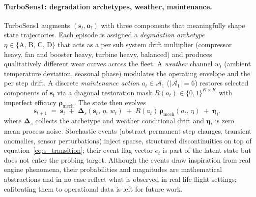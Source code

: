 \documentclass{article}
\begin{document}
\paragraph{TurboSens1: degradation archetypes, weather, maintenance.}
TurboSens1 augments $(\mathbf{s}_t, \mathbf{o}_t)$ with three components that meaningfully shape state trajectories. Each episode is assigned a \emph{degradation archetype} $\eta \in \{\text{A, B, C, D}\}$ that acts as a per sub system drift multiplier (compressor heavy, fan and booster heavy, turbine heavy, balanced) and produces qualitatively different wear curves across the fleet. A \emph{weather} channel $w_t$ (ambient temperature deviation, seasonal phase) modulates the operating envelope and the per step drift. A discrete \emph{maintenance action} $a_t \in \mathcal{A}_1$ ($|\mathcal{A}_1|{=}6$) restores selected components of $\mathbf{s}_t$ via a diagonal restoration mask $R(a_t) \in \{0,1\}^{K \times K}$ with imperfect efficacy $\boldsymbol{\rho}_\mathrm{mech}$. The state then evolves
\begin{equation}
    \mathbf{s}_{t+1} \;=\; \mathbf{s}_t \;+\; \boldsymbol{\Delta}_{\!s}(\mathbf{s}_t,\, \eta,\, w_t) \;+\; R(a_t)\,\boldsymbol{\rho}_\mathrm{mech}(a_t,\, \eta) \;+\; \boldsymbol{\eta}_t,
    \label{eq:s_transition}
\end{equation}
where $\boldsymbol{\Delta}_{\!s}$ collects the archetype and weather conditional drift and $\boldsymbol{\eta}_t$ is zero mean process noise. Stochastic events (abstract permanent step changes, transient anomalies, sensor perturbations) inject sparse, structured discontinuities on top of equation~\ref{eq:s_transition}; their event flag vector $e_t$ is part of the latent state but does not enter the probing target. Although the events draw inspiration from real engine phenomena, their probabilities and magnitudes are mathematical abstractions and in no case reflect what is observed in real life flight settings; calibrating them to operational data is left for future work.
\end{document}
